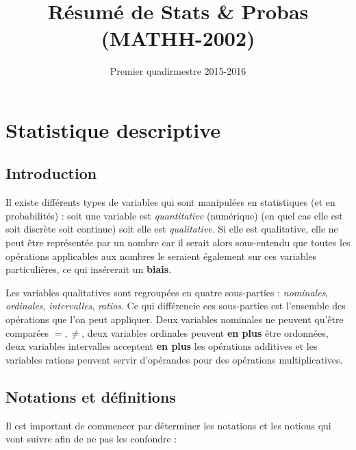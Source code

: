 \documentclass{article}
\title{Résumé de Stats \& Probas (MATHH-2002)}
\date{Premier quadirmestre 2015-2016}
\author{}
\begin{document}
\maketitle
\tableofcontents
\newpage
{}

\section{Statistique descriptive}
	\subsection{Introduction}
		Il existe différents types de variables qui sont manipulées en statistiques (et en probabilités) : soit une variable est \textit{quantitative} (numérique)
		(en quel cas elle est soit discrète soit continue) soit elle est \textit{qualitative}. Si elle est qualitative, elle ne peut être représentée par un nombre car il
		serait alors sous-entendu que toutes les opérations applicables aux nombres le seraient également sur ces variables particulières, ce qui insérerait un \textbf{biais}.

		Les variables qualitatives sont regroupées en quatre sous-parties : \textit{nominales}, \textit{ordinales}, \textit{intervalles}, \textit{ratios}. Ce qui différencie
		ces sous-parties est l'ensemble des opérations que l'on peut appliquer. Deux variables nominales ne peuvent qu'être comparées $=,\neq$, deux variables ordinales peuvent
		\textbf{en plus} être ordonnées, deux variables intervalles acceptent \textbf{en plus} les opérations additives et les variables rations peuvent servir d'opérandes
		pour des opérations multiplicatives.
	
	\subsection{Notations et définitions}
		Il est important de commencer par déterminer les notations et les notions qui vont suivre afin de ne pas les confondre :
\end{document}
